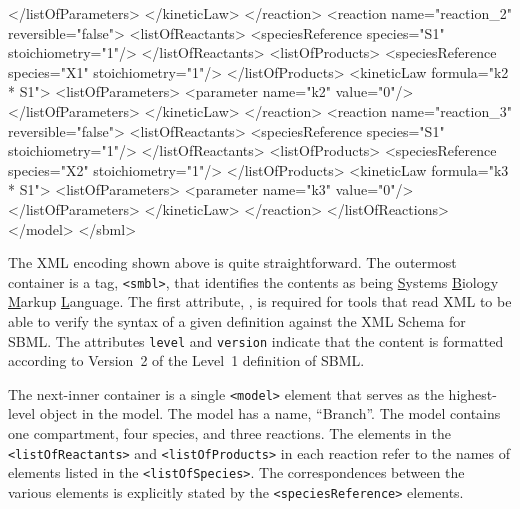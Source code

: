 \documentclass[10pt]{cekarticle}
\newcommand{\changed}[1]{\textcolor{BrickRed}{#1}}
\newenvironment{blockChanged}{\color{BrickRed}}{}
\begin{document}
\begin{example}
                    </listOfParameters>
                </kineticLaw>
            </reaction>
            <reaction name="reaction_2" reversible="false">
                <listOfReactants>
                    <\changed{speciesReference} \changed{species=}"S1" stoichiometry="1"/>
                </listOfReactants>
                <listOfProducts>
                    <\changed{speciesReference} \changed{species=}"X1" stoichiometry="1"/>
                </listOfProducts>
                <kineticLaw formula="k2 * S1">
                    <listOfParameters>
                        <parameter name="k2" value="0"/>
                    </listOfParameters>
                </kineticLaw>
            </reaction>
            <reaction name="reaction_3" reversible="false">
                <listOfReactants>
                    <\changed{speciesReference} \changed{species=}"S1" stoichiometry="1"/>
                </listOfReactants>
                <listOfProducts>
                    <\changed{speciesReference} \changed{species=}"X2" stoichiometry="1"/>
                </listOfProducts>
                <kineticLaw formula="k3 * S1">
                    <listOfParameters>
                        <parameter name="k3" value="0"/>
                    </listOfParameters>
                </kineticLaw>
            </reaction>
        </listOfReactions>
    </model>
</sbml>
\end{example}


\begin{blockChanged}
The XML encoding shown above is quite straightforward. The outermost
container is a tag, \texttt{<smbl>}, that identifies the contents as being
\underline{S}ystems \underline{B}iology \underline{M}arkup
\underline{L}anguage.  The first attribute, , is required for
tools that read XML to be able to verify the syntax of a given definition
against the XML Schema for SBML.  The attributes \texttt{level} and
\texttt{version} indicate that the content is formatted according to
Version~2 of the Level~1 definition of SBML.
\end{blockChanged}

The next-inner container is a single \texttt{<model>} element that serves
as the highest-level object in the model.  The model has a name,
``Branch''.  The model contains one compartment, four species, and three
reactions.  The elements in the \texttt{<listOfReactants>} and
\texttt{<listOfProducts>} in each reaction refer to the names of elements
listed in the \texttt{<listOfSpecies>}.  The correspondences between the
various elements is explicitly stated by the
\changed{\texttt{<speciesReference>}} elements.
\end{document}
